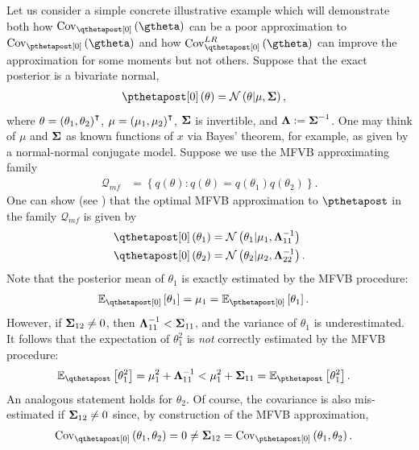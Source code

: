 \documentclass{article}\usepackage[]{graphicx}\usepackage[]{color}
\theoremstyle{definition}
\theoremstyle{plain}
\theoremstyle{plain}
\theoremstyle{plain}
\theoremstyle{definition}
\theoremstyle{plain}
\theoremstyle{plain}
\begin{document}
Let us consider a simple concrete illustrative example which will
demonstrate both how $\qcov\left(\gtheta\right)$ can be a poor approximation
to $\pcov\left(\gtheta\right)$ and how $\lrvbcov\left(\gtheta\right)$
can improve the approximation for some moments but not others. Suppose
that the exact posterior is a bivariate normal,
\begin{align}
\pzeropost\left(\theta\right) & =\mathcal{N}\left(\theta \vert \mu,\covmat\right),\label{eq:normal_example}
\end{align}
where $\theta=\left(\theta_{1},\theta_{2}\right)^{\intercal}$, $\mu=\left(\mu_{1},\mu_{2}\right)^{\intercal}$,
$\boldsymbol{\Sigma}$ is invertible, and $\boldsymbol{\Lambda}:=\boldsymbol{\Sigma}^{-1}$. One may think
of $\mu$ and $\boldsymbol{\Sigma}$ as known functions of $x$
via Bayes' theorem, for example, as given by a normal-normal conjugate
model. Suppose we use the MFVB approximating family
\begin{align*}
\mathcal{Q}_{mf} & =\left\{ q\left(\theta\right):q\left(\theta\right)=q\left(\theta_{1}\right)q\left(\theta_{2}\right)\right\} .
\end{align*}
One can show (see ) that the optimal
MFVB approximation to $\pthetapost$ in the family $\mathcal{Q}_{mf}$
is given by
\begin{align*}
\qzeropost\left(\theta_{1}\right) & =\mathcal{N}\left(\theta_{1} \vert \mu_{1},\infomat_{11}^{-1}\right)\\
\qzeropost\left(\theta_{2}\right) & =\mathcal{N}\left(\theta_{2} \vert \mu_{2},\infomat_{22}^{-1}\right).
\end{align*}
Note that the posterior mean of $\theta_{1}$ is exactly estimated
by the MFVB procedure:
\begin{align*}
\mbe_{\qzeropost}\left[\theta_{1}\right] & =\mu_{1}=\mbe_{\pzeropost}\left[\theta_{1}\right].
\end{align*}
However, if $\boldsymbol{\Sigma}_{12}\ne0$, then $\boldsymbol{\Lambda}_{11}^{-1}<\boldsymbol{\Sigma}_{11}$,
and the variance of $\theta_{1}$ is underestimated. It follows that
the expectation of $\theta_{1}^{2}$ is \textit{not} correctly estimated
by the MFVB procedure:
\begin{align*}
\mbeq\left[\theta_{1}^{2}\right] & =\mu_{1}^{2}+\infomat_{11}^{-1}<\mu_{1}^{2}+\covmat_{11}=\mbep\left[\theta_{1}^{2}\right].
\end{align*}
An analogous statement holds for $\theta_{2}$. Of course, the covariance
is also mis-estimated if $\boldsymbol{\Sigma}_{12}\ne0$ since, by construction
of the MFVB approximation,
\begin{align*}
\qcov\left(\theta_{1},\theta_{2}\right) & =0\ne\covmat_{12}=\pcov\left(\theta_{1},\theta_{2}\right).
\end{align*}
\end{document}
